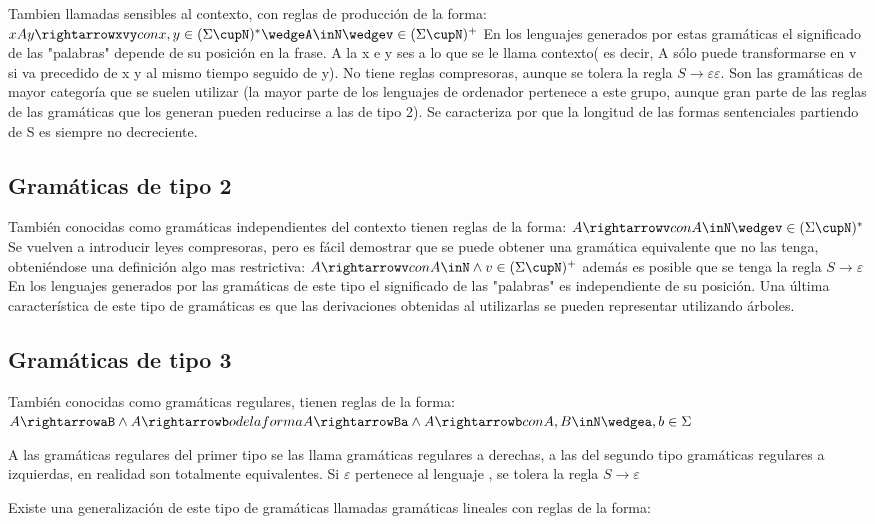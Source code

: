 Tambien llamadas sensibles al contexto, con reglas de producción de la forma:
$xAy \rightarrowxvy con x,y\in(\Sigma\cupN)^{*}\wedgeA\inN\wedgev\in(\Sigma\cupN)^{+}$
En los lenguajes generados por estas gramáticas el significado de las "palabras" depende de su posición en la frase.
A la x e y ses a lo que se le llama contexto( es decir, A sólo puede transformarse en v si va precedido de x y al mismo tiempo seguido de y).
No tiene reglas compresoras, aunque se tolera la regla $S\rightarrow\varepsilon\varepsilon$.
Son las gramáticas de mayor categoría que se suelen utilizar (la mayor parte de los lenguajes de ordenador pertenece a este grupo, aunque gran parte de las reglas de las gramáticas que los generan pueden reducirse  a las de tipo 2).
Se caracteriza por que la longitud de las formas sentenciales partiendo de S es siempre no decreciente.

\subsection{Gramáticas de tipo 2}
También conocidas como gramáticas independientes del contexto tienen reglas de la forma:
$A\rightarrowv con A\inN\wedgev\in(\Sigma\cupN)^{*}$
Se vuelven a introducir leyes compresoras, pero es fácil demostrar que se puede obtener una gramática equivalente que no las tenga, obteniéndose una definición algo mas restrictiva:
$A\rightarrowv con A \inN\wedge v\in(\Sigma\cupN)^{+}$
además es posible que se tenga la regla $S\rightarrow\varepsilon$
En los lenguajes generados por las gramáticas de este tipo el significado de las "palabras"  es independiente de su posición.
Una última característica de este tipo de gramáticas es que las derivaciones obtenidas al utilizarlas se pueden representar utilizando árboles.
\subsection{Gramáticas de tipo 3}
También conocidas como gramáticas regulares, tienen reglas de la forma:
$A\rightarrowaB \wedge A\rightarrowb o de la formaA\rightarrowBa \wedge A\rightarrowb con A,B\inN \wedgea,b\in\Sigma $

A las gramáticas regulares del primer tipo se las llama gramáticas regulares a derechas, a las del segundo tipo gramáticas regulares a izquierdas, en realidad son totalmente equivalentes. Si $\varepsilon$ pertenece al lenguaje , se tolera la regla $S\rightarrow\varepsilon$

Existe una generalización de este tipo de gramáticas llamadas gramáticas lineales con reglas de la forma:

